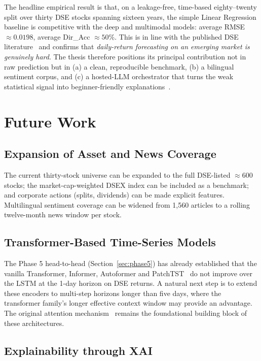 \documentclass[12pt,a4paper,oneside]{report}
\begin{document}
The headline empirical result is that, on a leakage-free,
time-based eighty--twenty split over thirty DSE stocks spanning
sixteen years, the simple Linear Regression baseline is competitive
with the deep and multimodal models: average \ac{RMSE}
$\approx 0.0198$, average Dir\_Acc $\approx 50\%$. This is in line
with the published DSE literature~\cite{hossain2019dse,islam2018forecasting}
and confirms that \emph{daily-return forecasting on an emerging
market is genuinely hard}. The thesis therefore positions its
principal contribution not in raw prediction but in (a) a clean,
reproducible benchmark, (b) a bilingual sentiment corpus, and
(c) a hosted-\ac{LLM} orchestrator that turns the weak
statistical signal into beginner-friendly
explanations~\cite{lopez2023canchatgpt,park2023generative}.

\section{Future Work}

\subsection{Expansion of Asset and News Coverage}

The current thirty-stock universe can be expanded to the full
DSE-listed $\approx 600$ stocks; the market-cap-weighted DSEX
index can be included as a benchmark; and corporate actions
(splits, dividends) can be made explicit features. Multilingual
sentiment coverage can be widened from 1{,}560 articles to a
rolling twelve-month news window per stock.

\subsection{Transformer-Based Time-Series Models}

The Phase 5 head-to-head (Section~\ref{sec:phase5}) has already
established that the vanilla Transformer, Informer, Autoformer
and PatchTST~\cite{zhou2021informer,wu2021autoformer,nie2023patchtst}
do not improve over the \ac{LSTM} at the 1-day horizon on DSE
returns. A natural next step is to extend these encoders to
multi-step horizons longer than five days, where the
transformer family's longer effective context window may
provide an advantage. The original attention
mechanism~\cite{vaswani2017attention} remains the foundational
building block of these architectures.

\subsection{Explainability through \ac{XAI}}
\end{document}
